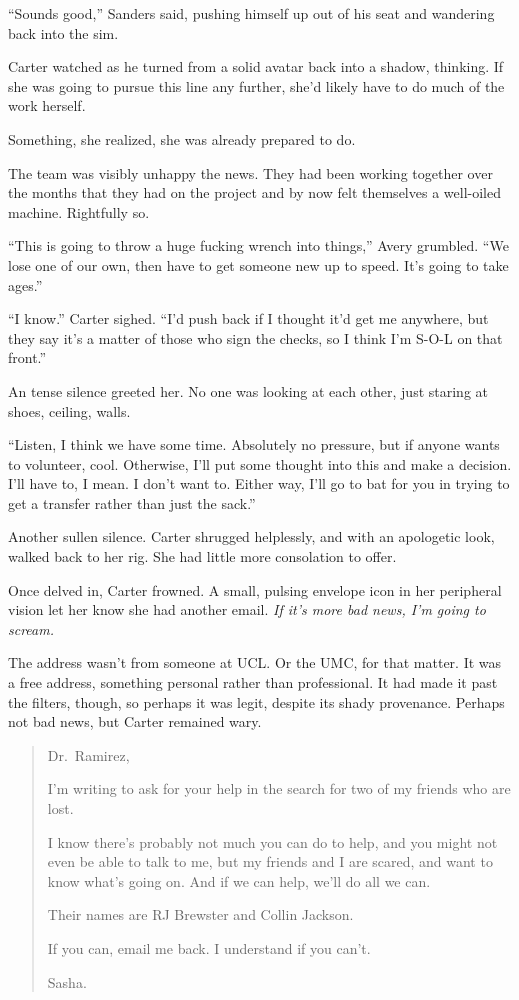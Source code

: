 ``Sounds good,'' Sanders said, pushing himself up out of his seat and wandering back into the sim.

Carter watched as he turned from a solid avatar back into a shadow, thinking. If she was going to pursue this line any further, she'd likely have to do much of the work herself.

Something, she realized, she was already prepared to do.

The team was visibly unhappy the news. They had been working together over the months that they had on the project and by now felt themselves a well-oiled machine. Rightfully so.

``This is going to throw a huge fucking wrench into things,'' Avery grumbled. ``We lose one of our own, then have to get someone new up to speed. It's going to take ages.''

``I know.'' Carter sighed. ``I'd push back if I thought it'd get me anywhere, but they say it's a matter of those who sign the checks, so I think I'm S-O-L on that front.''

An tense silence greeted her. No one was looking at each other, just staring at shoes, ceiling, walls.

``Listen, I think we have some time. Absolutely no pressure, but if anyone wants to volunteer, cool. Otherwise, I'll put some thought into this and make a decision. I'll have to, I mean. I don't want to. Either way, I'll go to bat for you in trying to get a transfer rather than just the sack.''

Another sullen silence. Carter shrugged helplessly, and with an apologetic look, walked back to her rig. She had little more consolation to offer.

Once delved in, Carter frowned. A small, pulsing envelope icon in her peripheral vision let her know she had another email. \emph{If it's more bad news, I'm going to scream.}

The address wasn't from someone at UCL. Or the UMC, for that matter. It was a free address, something personal rather than professional. It had made it past the filters, though, so perhaps it was legit, despite its shady provenance. Perhaps not bad news, but Carter remained wary.

\begin{quote}
Dr.~Ramirez,

I'm writing to ask for your help in the search for two of my friends who are lost.

I know there's probably not much you can do to help, and you might not even be able to talk to me, but my friends and I are scared, and want to know what's going on. And if we can help, we'll do all we can.

Their names are RJ Brewster and Collin Jackson.

If you can, email me back. I understand if you can't.

Sasha.
\end{quote}

